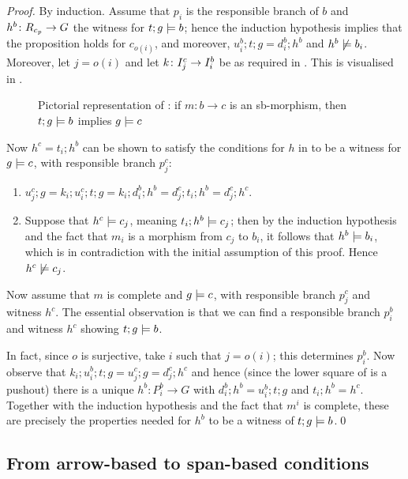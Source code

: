 \begin{proof}
By induction. Assume that $p_i$ is the responsible branch of $b$ and $h^b\colon R_{c_p}\rightarrow G$ the witness for $t;g\models b$; hence the induction hypothesis implies that the proposition holds for $c_{o(i)}$, and moreover, $u^b_i;t;g=d^b_i;h^b$ and $h^b\not\models b_i$. Moreover, let $j=o(i)$ and let $k\colon I^c_j\rightarrow I^b_i$ be as required in . This is visualised in .
%
\begin{figure}
  \centering
  
  \caption{Pictorial representation of : if $m:b\rightarrow c$ is an sb-morphism, then $t;g\models b$ implies $g\models c$}
\end{figure}

Now $h^c=t_i;h^b$ can be shown to satisfy the conditions for $h$ in  to be a witness for $g\models c$, with responsible branch $p^c_j$:
\begin{enumerate}
\item $u^c_j;g = k_i;u^c_i;t;g= k_i;d^b_i;h^b = d^c_j;t_i;h^b=d^c_j;h^c$.
\item Suppose that $h^c\models c_j$, meaning $t_i;h^b\models c_j$; then by the induction hypothesis and the fact that $m_i$ is a morphism from $c_j$ to $b_i$, it follows that $h^b\models b_i$, which is in contradiction with the initial assumption of this proof. Hence $h^c\not\models c_j$.
\end{enumerate}
%
Now assume that $m$ is complete and $g\models c$, with responsible branch $p^c_j$ and witness $h^c$. The essential observation is that we can find a responsible branch $p^b_i$ and witness $h^c$ showing $t;g\models b$.

In fact, since $o$ is surjective, take $i$ such that $j=o(i)$; this determines $p^b_i$. Now observe that $k_i;u^b_i;t;g=u^c_j;g=d^c_j;h^c$ and hence (since the lower square of  is a pushout) there is a unique $h^b:P^b_i\to G$ with $d^b_i;h^b=u^b_i;t;g$ and $t_i;h^b=h^c$. Together with the induction hypothesis and the fact that $m^i$ is complete, these are precisely the properties needed for $h^b$ to be a witness of $t;g\models b$.\qed
\end{proof}

\subsection{From arrow-based to span-based conditions}

